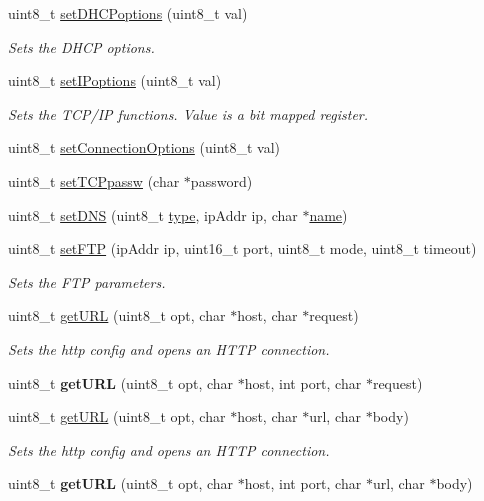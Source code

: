 \begin{DoxyCompactItemize}
uint8\+\_\+t \hyperlink{class_wasp_w_i_f_i_ab2ab440670add32aa37159e325b01922}{set\+D\+H\+C\+Poptions} (uint8\+\_\+t val)
\begin{DoxyCompactList}\small\item\em Sets the D\+H\+CP options. \end{DoxyCompactList}\item 
uint8\+\_\+t \hyperlink{class_wasp_w_i_f_i_ac4ae053e7a3005dcd56a359fdc557d4c}{set\+I\+Poptions} (uint8\+\_\+t val)
\begin{DoxyCompactList}\small\item\em Sets the T\+C\+P/\+IP functions. Value is a bit mapped register. \end{DoxyCompactList}\item 
uint8\+\_\+t \hyperlink{class_wasp_w_i_f_i_ae914549e2773f718218bf615887b46c7}{set\+Connection\+Options} (uint8\+\_\+t val)
\item 
uint8\+\_\+t \hyperlink{class_wasp_w_i_f_i_ad01285dacfcbd9284ebee63566d7d410}{set\+T\+C\+Ppassw} (char $\ast$password)
\item 
uint8\+\_\+t \hyperlink{class_wasp_w_i_f_i_ac23ad05bf419ce2dd028bf1e212174e9}{set\+D\+NS} (uint8\+\_\+t \hyperlink{_sd_fat_structs_8h_a1d127017fb298b889f4ba24752d08b8e}{type}, ip\+Addr ip, char $\ast$\hyperlink{_sd_fat_structs_8h_a30308c9b983377042fd2cc8900454fb1}{name})
\item 
uint8\+\_\+t \hyperlink{class_wasp_w_i_f_i_a53afc754c1f0aede89c91e28c30ae8e5}{set\+F\+TP} (ip\+Addr ip, uint16\+\_\+t port, uint8\+\_\+t mode, uint8\+\_\+t timeout)
\begin{DoxyCompactList}\small\item\em Sets the F\+TP parameters. \end{DoxyCompactList}\item 
uint8\+\_\+t \hyperlink{class_wasp_w_i_f_i_ab3bcb791e15d3c138251fab80f32f223}{get\+U\+RL} (uint8\+\_\+t opt, char $\ast$host, char $\ast$request)
\begin{DoxyCompactList}\small\item\em Sets the http config and opens an H\+T\+TP connection. \end{DoxyCompactList}\item 
uint8\+\_\+t {\bfseries get\+U\+RL} (uint8\+\_\+t opt, char $\ast$host, int port, char $\ast$request)\hypertarget{class_wasp_w_i_f_i_abf95bfd143ffd0701caaf8ee70e2482f}{}\label{class_wasp_w_i_f_i_abf95bfd143ffd0701caaf8ee70e2482f}

\item 
uint8\+\_\+t \hyperlink{class_wasp_w_i_f_i_ac4012f34188aa513587e4138eb41cf1b}{get\+U\+RL} (uint8\+\_\+t opt, char $\ast$host, char $\ast$url, char $\ast$body)
\begin{DoxyCompactList}\small\item\em Sets the http config and opens an H\+T\+TP connection. \end{DoxyCompactList}\item 
uint8\+\_\+t {\bfseries get\+U\+RL} (uint8\+\_\+t opt, char $\ast$host, int port, char $\ast$url, char $\ast$body)\hypertarget{class_wasp_w_i_f_i_a531fa81a30214223f863e061d1d191a0}{}\label{class_wasp_w_i_f_i_a531fa81a30214223f863e061d1d191a0}


\end{DoxyCompactItemize}

